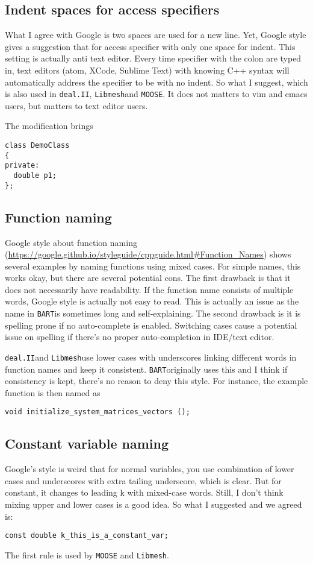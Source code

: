 \documentclass{article}
\newcommand{\bart}{{\tt BART}}
\newcommand{\libmesh}{{\tt Libmesh}}
\newcommand{\dealii}{{\tt deal.II}}
\newcommand{\moose}{{\tt MOOSE}}
\begin{document}
\subsection{Indent spaces for access specifiers}
What I agree with Google is two spaces are used for a new line. Yet, Google style gives a suggestion that for access specifier with only one space for indent. This setting is actually anti text editor. Every time specifier with the colon are typed in, text editors (atom, XCode, Sublime Text) with knowing C++ syntax will automatically address the specifier to be with no indent. So what I suggest, which is also used in \dealii, \libmesh and \moose. It does not matters to vim and emacs users, but matters to text editor users.

The modification brings
\begin{lstlisting}
class DemoClass
{
private:
  double p1;
};
\end{lstlisting}
\subsection{Function naming}
Google style about function naming (\url{https://google.github.io/styleguide/cppguide.html#Function_Names}) shows several examples by naming functions using mixed cases. For simple names, this works okay, but there are several potential cons.
The first drawback is that it does not necessarily have readability. If the function name consists of multiple words, Google style is actually not easy to read. This is actually an issue as the name in \bart is sometimes long and self-explaining. The second drawback is it is spelling prone if no auto-complete is enabled. Switching cases cause a potential issue on spelling if there's no proper auto-completion in IDE/text editor.

\dealii and \libmesh use lower cases with underscores linking different words in function names and keep it consistent. \bart originally uses this and I think if consistency is kept, there's no reason to deny this style. For instance, the example function is then named as
\begin{lstlisting}
void initialize_system_matrices_vectors ();
\end{lstlisting}
\subsection{Constant variable naming}
Google's style is weird that for normal variables, you use combination of lower cases and underscores with extra tailing underscore, which is clear. But for constant, it changes to leading k with mixed-case words. Still, I don't think mixing upper and lower cases is a good idea. So what I suggested and we agreed is:
\begin{lstlisting}
const double k_this_is_a_constant_var;
\end{lstlisting}
The first rule is used by {\tt MOOSE} and \libmesh.
\end{document}
